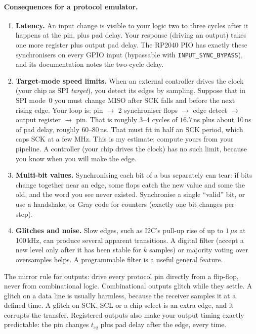 \paragraph{Consequences for a protocol emulator.}
\begin{enumerate}[label=(\alph*)]
  \item \textbf{Latency.} An input change is visible to your logic two to
    three cycles after it happens at the pin, plus pad delay. Your response
    (driving an output) takes one more register plus output pad delay.
    The RP2040 PIO has exactly these synchronisers on every GPIO input
    (bypassable with \texttt{INPUT\_SYNC\_BYPASS}), and its documentation
    notes the two-cycle delay.
  \item \textbf{Target-mode speed limits.} When an external controller
    drives the clock (your chip as SPI \emph{target}), you detect its edges
    by sampling. Suppose that in SPI mode~0 you must change MISO after SCK
    falls and before the next rising edge. Your loop is: pin $\to$ 2
    synchroniser flops $\to$ edge detect $\to$ output register $\to$ pin.
    That is roughly 3--4 cycles of $16.7$\,ns plus about 10\,ns of pad
    delay, roughly 60--80\,ns. That must fit in half an SCK period, which
    caps SCK at a few MHz. This is my estimate; compute yours from your
    pipeline. A controller (your chip drives the clock) has no such limit,
    because you know when you will make the edge.
  \item \textbf{Multi-bit values.} Synchronising each bit of a bus separately
    can tear: if bits change together near an edge, some flops catch the new
    value and some the old, and the word you see never existed. Synchronise
    a single ``valid'' bit, or use a handshake, or Gray code for counters
    (exactly one bit changes per step).
  \item \textbf{Glitches and noise.} Slow edges, such as I2C's pull-up rise
    of up to $1\,\mu$s at 100\,kHz, can produce several apparent
    transitions. A digital filter (accept a new level only after it has
    been stable for $k$ samples) or majority voting over oversamples helps.
    A programmable filter is a useful general feature.
\end{enumerate}

\begin{remark}
The mirror rule for outputs: drive every protocol pin directly from a
flip-flop, never from combinational logic. Combinational outputs glitch while
they settle. A glitch on a data line is usually harmless, because the
receiver samples it at a defined time. A glitch on SCK, SCL or a chip select
is an extra edge, and it corrupts the transfer. Registered outputs also make
your output timing exactly predictable: the pin changes $t_{cq}$ plus pad
delay after the edge, every time.
\end{remark}

